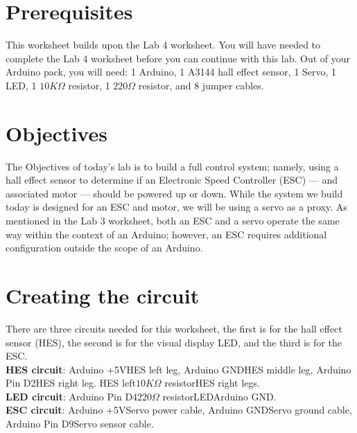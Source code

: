 \documentclass[11pt,a4paper]{article}
\begin{document}
\pagestyle{fancy}

\section*{Prerequisites}
This worksheet builds upon the Lab 4 worksheet. You will have needed to complete the Lab 4 worksheet before you can continue with this lab. Out of your Arduino pack, you will need: 1 Arduino, 1 A3144 hall effect sensor, 1 Servo, 1 LED, 1 $10K\Omega$ resistor, 1 $220\Omega$ resistor, and 8 jumper cables.

\section*{Objectives}
The Objectives of today's lab is to build a full control system; namely, using a hall effect sensor to determine if an Electronic Speed Controller (ESC) --- and associated motor --- should be powered up or down. While the system we build today is designed for an ESC and motor, we will be using a servo as a proxy. As mentioned in the Lab 3 worksheet, both an ESC and a servo operate the same way within the context of an Arduino; however, an ESC requires additional configuration outside the scope of an Arduino.

\section{Creating the circuit}
\label{sec:circuit}
There are three circuits needed for this worksheet, the first is for the hall effect sensor (HES), the second is for the visual display LED, and the third is for the ESC.\\
\noindent
\textbf{HES circuit}: Arduino +5V\textrightarrow\hspace{0.1em}HES left leg, Arduino GND\textrightarrow\hspace{0.1em}HES middle leg, Arduino Pin D2\textrightarrow\hspace{0.1em}HES right leg. HES left\textrightarrow \hspace{0.1em}$10K\Omega$ resistor\textrightarrow\hspace{0.1em}HES right legs.\\
\noindent
\textbf{LED circuit}: Arduino Pin D4\textrightarrow $220\Omega$ resistor\textrightarrow LED\textrightarrow Arduino GND.\\
\noindent
\textbf{ESC circuit}: Arduino +5V\textrightarrow Servo power cable, Arduino GND\textrightarrow Servo ground cable, Arduino Pin D9\textrightarrow Servo sensor cable.
\end{document}
